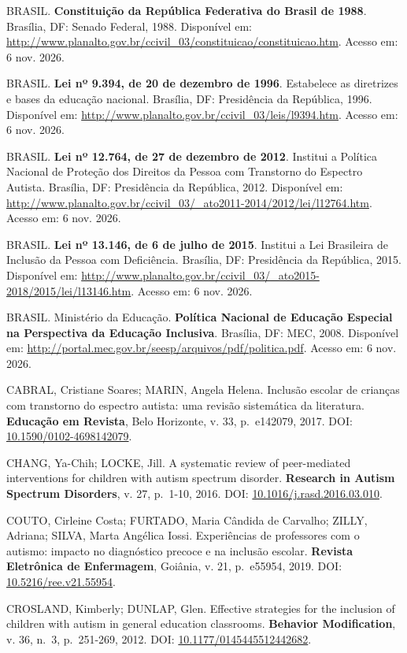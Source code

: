 BRASIL. \textbf{Constituição da República Federativa do Brasil de 1988}.
Brasília, DF: Senado Federal, 1988. Disponível em:
\url{http://www.planalto.gov.br/ccivil_03/constituicao/constituicao.htm}.
Acesso em: 6 nov. 2026.

BRASIL. \textbf{Lei nº 9.394, de 20 de dezembro de 1996}. Estabelece as
diretrizes e bases da educação nacional. Brasília, DF: Presidência da
República, 1996. Disponível em:
\url{http://www.planalto.gov.br/ccivil_03/leis/l9394.htm}. Acesso em: 6 nov.
2026.

BRASIL. \textbf{Lei nº 12.764, de 27 de dezembro de 2012}. Institui a
Política Nacional de Proteção dos Direitos da Pessoa com Transtorno do
Espectro Autista. Brasília, DF: Presidência da República, 2012.
Disponível em:
\url{http://www.planalto.gov.br/ccivil_03/_ato2011-2014/2012/lei/l12764.htm}.
Acesso em: 6 nov. 2026.

BRASIL. \textbf{Lei nº 13.146, de 6 de julho de 2015}. Institui a Lei
Brasileira de Inclusão da Pessoa com Deficiência. Brasília, DF:
Presidência da República, 2015. Disponível em:
\url{http://www.planalto.gov.br/ccivil_03/_ato2015-2018/2015/lei/l13146.htm}.
Acesso em: 6 nov. 2026.

BRASIL. Ministério da Educação. \textbf{Política Nacional de Educação
Especial na Perspectiva da Educação Inclusiva}. Brasília, DF: MEC, 2008.
Disponível em: \url{http://portal.mec.gov.br/seesp/arquivos/pdf/politica.pdf}.
Acesso em: 6 nov. 2026.

CABRAL, Cristiane Soares; MARIN, Angela Helena. Inclusão escolar de
crianças com transtorno do espectro autista: uma revisão sistemática da
literatura. \textbf{Educação em Revista}, Belo Horizonte, v. 33,
p.~e142079, 2017. DOI: \url{10.1590/0102-4698142079}.

CHANG, Ya-Chih; LOCKE, Jill. A systematic review of peer-mediated
interventions for children with autism spectrum disorder.
\textbf{Research in Autism Spectrum Disorders}, v. 27, p.~1-10, 2016.
DOI: \url{10.1016/j.rasd.2016.03.010}.

COUTO, Cirleine Costa; FURTADO, Maria Cândida de Carvalho; ZILLY,
Adriana; SILVA, Marta Angélica Iossi. Experiências de professores com o
autismo: impacto no diagnóstico precoce e na inclusão escolar.
\textbf{Revista Eletrônica de Enfermagem}, Goiânia, v. 21, p.~e55954,
2019. DOI: \url{10.5216/ree.v21.55954}.

CROSLAND, Kimberly; DUNLAP, Glen. Effective strategies for the inclusion
of children with autism in general education classrooms.
\textbf{Behavior Modification}, v. 36, n.~3, p.~251-269, 2012. DOI:
\url{10.1177/0145445512442682}.

